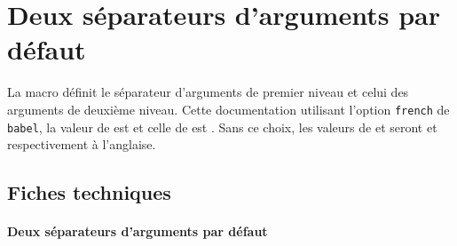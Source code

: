 \documentclass[12pt,a4paper]{article}
\begin{document}
\section{Deux séparateurs d'arguments par défaut}

La macro  définit le séparateur d'arguments de premier niveau et  celui des arguments de deuxième niveau.
Cette documentation utilisant l'option \verb+french+ de \verb+babel+, la valeur de 
 est \fbox{\,\tnsmathsep$\vphantom{F}$\,} 
et celle de
 est \fbox{\,\tnsmathsubsep$\vphantom{F}$\,} .
Sans ce choix, les valeurs de  et  seront \fbox{\,\tnsmathsubsep$\vphantom{F}$\,} et \fbox{\,\tnsmathsep$\vphantom{F}$\,} respectivement à l'anglaise.


\subsection{Fiches techniques}

\paragraph{Deux séparateurs d'arguments par défaut}


\end{document}
